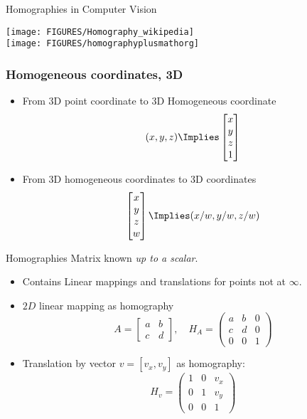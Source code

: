 \documentclass[9pt]{beamer}
\begin{document}
\begin{frame}[t]{Homographies in Computer Vision}
  \begin{center}
    \texttt{[image: FIGURES/Homography\_wikipedia]}\\
    \texttt{[image: FIGURES/homographyplusmathorg]}
  \end{center}
\end{frame}



\begin{frame}
  \frametitle{Homogeneous coordinates, 3D}
  \begin{itemize}
  \item From 3D point coordinate to 3D Homogeneous coordinate
    $$
    (x,y,z)\Implies
    \begin{bmatrix}
      x\\y\\z\\1
    \end{bmatrix}
    $$
  \item From 3D homogeneous coordinates to 3D coordinates
    $$   
    \begin{bmatrix}
      x\\y\\z\\w
    \end{bmatrix}
    \Implies 
    (x/w, y/w, z/w)
    $$
  \end{itemize}
\end{frame}

\begin{frame}[t]{Homographies}
  Matrix known \emph{up to a scalar}.
  \begin{itemize}
  \item Contains Linear mappings and translations for points not at $\infty$.
  \item $2D$ linear mapping as homography
    $$
    A =
    \begin{bmatrix}
      a & b\\
      c & d
    \end{bmatrix},\quad
    H_A =
    \begin{pmatrix}
      a & b & 0\\
      c & d & 0\\
      0 & 0 & 1
    \end{pmatrix}
    $$
    \item Translation by vector $v = [v_x, v_y]$ as homography:
      $$
      H_v =
      \begin{pmatrix}
        1 & 0 & v_x\\
        0 & 1 & v_y\\
        0 & 0 & 1
        
      \end{pmatrix}
      $$
  \end{itemize}
\end{frame}
\end{document}

